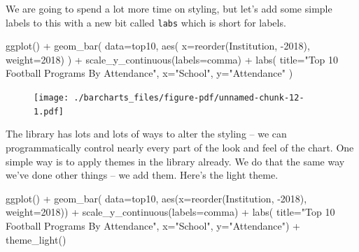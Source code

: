 \documentclass[
  letterpaper,
  DIV=11,
  numbers=noendperiod]{scrreprt}
\newenvironment{Shaded}{\begin{snugshade}}{\end{snugshade}}
\newcommand{\AttributeTok}[1]{\textcolor[rgb]{0.40,0.45,0.13}{#1}}
\newcommand{\FunctionTok}[1]{\textcolor[rgb]{0.28,0.35,0.67}{#1}}
\newcommand{\NormalTok}[1]{\textcolor[rgb]{0.00,0.23,0.31}{#1}}
\newcommand{\SpecialCharTok}[1]{\textcolor[rgb]{0.37,0.37,0.37}{#1}}
\newcommand{\StringTok}[1]{\textcolor[rgb]{0.13,0.47,0.30}{#1}}
\begin{document}
We are going to spend a lot more time on styling, but let's add some
simple labels to this with a new bit called \texttt{labs} which is short
for labels.

\begin{Shaded}
\begin{Highlighting}[]
\FunctionTok{ggplot}\NormalTok{() }\SpecialCharTok{+} 
  \FunctionTok{geom\_bar}\NormalTok{(}
    \AttributeTok{data=}\NormalTok{top10, }
    \FunctionTok{aes}\NormalTok{(}
      \AttributeTok{x=}\FunctionTok{reorder}\NormalTok{(Institution, }\SpecialCharTok{{-}}\StringTok{\textasciigrave{}}\AttributeTok{2018}\StringTok{\textasciigrave{}}\NormalTok{), }
      \AttributeTok{weight=}\StringTok{\textasciigrave{}}\AttributeTok{2018}\StringTok{\textasciigrave{}}\NormalTok{)}
\NormalTok{    ) }\SpecialCharTok{+} 
  \FunctionTok{scale\_y\_continuous}\NormalTok{(}\AttributeTok{labels=}\NormalTok{comma) }\SpecialCharTok{+} 
  \FunctionTok{labs}\NormalTok{(}
    \AttributeTok{title=}\StringTok{"Top 10 Football Programs By Attendance"}\NormalTok{, }
    \AttributeTok{x=}\StringTok{"School"}\NormalTok{, }
    \AttributeTok{y=}\StringTok{"Attendance"}
\NormalTok{)}
\end{Highlighting}
\end{Shaded}

\begin{figure}[H]

{\centering \texttt{[image: ./barcharts\_files/figure-pdf/unnamed-chunk-12-1.pdf]}

}

\end{figure}

The library has lots and lots of ways to alter the styling -- we can
programmatically control nearly every part of the look and feel of the
chart. One simple way is to apply themes in the library already. We do
that the same way we've done other things -- we add them. Here's the
light theme.

\begin{Shaded}
\begin{Highlighting}[]
\FunctionTok{ggplot}\NormalTok{() }\SpecialCharTok{+} 
  \FunctionTok{geom\_bar}\NormalTok{(}
    \AttributeTok{data=}\NormalTok{top10, }
    \FunctionTok{aes}\NormalTok{(}\AttributeTok{x=}\FunctionTok{reorder}\NormalTok{(Institution, }\SpecialCharTok{{-}}\StringTok{\textasciigrave{}}\AttributeTok{2018}\StringTok{\textasciigrave{}}\NormalTok{),}
        \AttributeTok{weight=}\StringTok{\textasciigrave{}}\AttributeTok{2018}\StringTok{\textasciigrave{}}\NormalTok{)) }\SpecialCharTok{+} 
  \FunctionTok{scale\_y\_continuous}\NormalTok{(}\AttributeTok{labels=}\NormalTok{comma) }\SpecialCharTok{+} 
  \FunctionTok{labs}\NormalTok{(}
    \AttributeTok{title=}\StringTok{"Top 10 Football Programs By Attendance"}\NormalTok{, }
    \AttributeTok{x=}\StringTok{"School"}\NormalTok{, }
    \AttributeTok{y=}\StringTok{"Attendance"}\NormalTok{) }\SpecialCharTok{+} 
  \FunctionTok{theme\_light}\NormalTok{()}
\end{Highlighting}
\end{Shaded}
\end{document}

